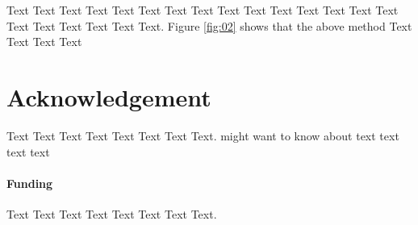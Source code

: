 \documentclass{bioinfo}
\begin{document}
Text Text Text Text Text Text  Text Text Text Text Text Text Text Text Text  Text Text Text Text Text Text. Figure \ref{fig:02} shows that the above method  Text Text Text Text


\section*{Acknowledgement}
Text Text Text Text Text Text  Text Text.  \citealp{Boffelli03} might want to know about  text text text text

\paragraph{Funding\textcolon} Text Text Text Text Text Text  Text Text.










\end{document}
